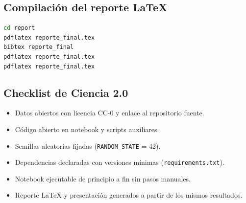 \subsection{Compilación del reporte LaTeX}

\begin{lstlisting}[language=bash,caption={Compilación del PDF en el directorio report/.}]
cd report
pdflatex reporte_final.tex
bibtex reporte_final
pdflatex reporte_final.tex
pdflatex reporte_final.tex
\end{lstlisting}

\subsection{Checklist de Ciencia 2.0}

\begin{itemize}
  \item[\checkmark] Datos abiertos con licencia CC-0 y enlace al repositorio fuente.
  \item[\checkmark] Código abierto en notebook y scripts auxiliares.
  \item[\checkmark] Semillas aleatorias fijadas (\texttt{RANDOM\_STATE} = 42).
  \item[\checkmark] Dependencias declaradas con versiones mínimas (\texttt{requirements.txt}).
  \item[\checkmark] Notebook ejecutable de principio a fin sin pasos manuales.
  \item[\checkmark] Reporte LaTeX y presentación generados a partir de los mismos resultados.
\end{itemize}
